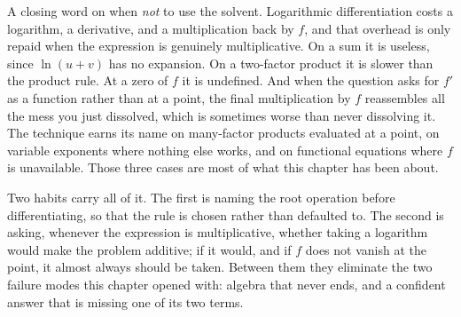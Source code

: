 A closing word on when \emph{not} to use the solvent. Logarithmic differentiation costs a logarithm, a derivative, and a multiplication back by $f$, and that overhead is only repaid when the expression is genuinely multiplicative. On a sum it is useless, since $\ln(u+v)$ has no expansion. On a two-factor product it is slower than the product rule. At a zero of $f$ it is undefined. And when the question asks for $f'$ as a function rather than at a point, the final multiplication by $f$ reassembles all the mess you just dissolved, which is sometimes worse than never dissolving it. The technique earns its name on many-factor products evaluated at a point, on variable exponents where nothing else works, and on functional equations where $f$ is unavailable. Those three cases are most of what this chapter has been about.

Two habits carry all of it. The first is naming the root operation before differentiating, so that the rule is chosen rather than defaulted to. The second is asking, whenever the expression is multiplicative, whether taking a logarithm would make the problem additive; if it would, and if $f$ does not vanish at the point, it almost always should be taken. Between them they eliminate the two failure modes this chapter opened with: algebra that never ends, and a confident answer that is missing one of its two terms.

